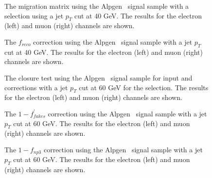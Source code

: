 \begin{figure}[htbp]
\centering
{}
\caption{The migration matrix using the Alpgen \ttbar\ signal sample with a selection using a jet $p_T$ cut at 40 GeV.  The results for the electron (left) and muon (right) channels are shown.}
\label{fig:MethodBmigration40}
\end{figure}

\begin{figure}[htbp]
\centering
{}
\caption{The $f_{reco}$ correction using the Alpgen \ttbar\ signal sample with a jet $p_T$ cut at 40 GeV.  The results for the electron (left) and muon (right) channels are shown.}
\label{fig:MethodBfreco40}
\end{figure}


\begin{sidewaysfigure}[htbp]
\centering
{}
\caption{The closure test using the Alpgen  \ttbar\ signal sample for input and corrections with a jet $p_T$
  cut at 60 GeV for the selection.  The
  results for the electron (left) and muon (right) channels are shown.}
\label{fig:MethodBclosure60}
\end{sidewaysfigure}

\begin{figure}[htbp]
\centering
{}
\caption{The $1 - f^{\prime}_{fakes}$ correction using the Alpgen \ttbar\ signal sample with a jet $p_T$ cut at 60 GeV.  The results for the electron (left) and muon (right) channels are shown.}
\label{fig:MethodBffakesp60}
\end{figure}


\begin{figure}[htbp]
\centering
{}
\caption{The $1 - f_{np3}$ correction using the Alpgen \ttbar\ signal sample with a jet $p_T$ cut at 60 GeV.  The results for the electron (left) and muon (right) channels are shown.}
\label{fig:MethodBfnp360}
\end{figure}


